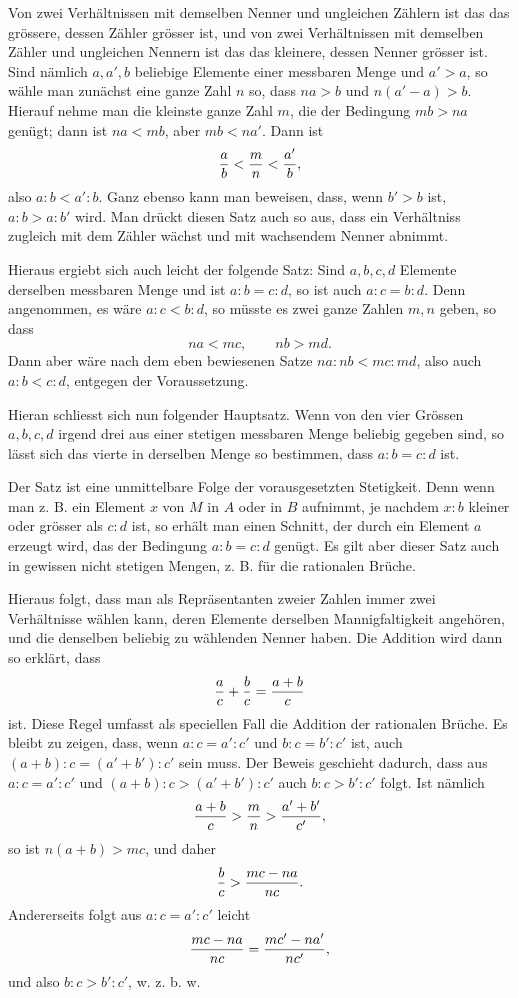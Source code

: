 \documentclass[11pt]{article}
\begin{document}
Von zwei Verhältnissen mit demselben Nenner und ungleichen Zählern ist das das grössere, dessen Zähler grösser ist, und von zwei Verhältnissen mit demselben Zähler und ungleichen Nennern ist das das kleinere, dessen Nenner grösser ist. Sind nämlich $a,a',b$ beliebige Elemente einer messbaren Menge und $a'>a$, so wähle man zunächst eine ganze Zahl $n$ so, dass $na>b$ und $n(a'-a)>b$. Hierauf nehme man die kleinste ganze Zahl $m$, die der Bedingung $mb>na$ genügt; dann ist $na<mb$, aber $mb<na'$. Dann ist
\[
 {a\over b}<{m\over n}<{a'
\over b},
\]
also $a:b<a':b$. Ganz ebenso kann man beweisen, dass, wenn $b'>b$ ist, $a:b>a:b'$ wird. Man drückt diesen Satz auch so aus, dass ein Verhältniss zugleich mit dem Zähler wächst und mit wachsendem Nenner abnimmt.

Hieraus ergiebt sich auch leicht der folgende Satz: Sind $a,b,c,d$ Elemente derselben messbaren Menge und ist $a:b=c:d$, so ist auch $a:c=b:d$. Denn angenommen, es wäre $a:c<b:d$, so müsste es zwei ganze Zahlen $m,n$ geben, so dass
\[
 na<mc,
 \qquad nb>md.
\]
Dann aber wäre nach dem eben bewiesenen Satze $na:nb<mc:md$, also auch $a:b<c:d$, entgegen der Voraussetzung.

Hieran schliesst sich nun folgender Hauptsatz. Wenn von den vier Grössen $a,b,c,d$ irgend drei aus einer stetigen messbaren Menge beliebig gegeben sind, so lässt sich das vierte in derselben Menge so bestimmen, dass $a:b=c:d$ ist.

Der Satz ist eine unmittelbare Folge der vorausgesetzten Stetigkeit. Denn wenn man z. B. ein Element $x$ von $M$ in $A$ oder in $B$ aufnimmt, je nachdem $x:b$ kleiner oder grösser als $c:d$ ist, so erhält man einen Schnitt, der durch ein Element $a$ erzeugt wird, das der Bedingung $a:b=c:d$ genügt. Es gilt aber dieser Satz auch in gewissen nicht stetigen Mengen, z. B. für die rationalen Brüche.

Hieraus folgt, dass man als Repräsentanten zweier Zahlen immer zwei Verhältnisse wählen kann, deren Elemente derselben Mannigfaltigkeit angehören, und die denselben beliebig zu wählenden Nenner haben. Die Addition wird dann so erklärt, dass
\[
 {a\over c}+{b\over c}={a+b\over c}
\]
ist. Diese Regel umfasst als speciellen Fall die Addition der rationalen Brüche. Es bleibt zu zeigen, dass, wenn $a:c=a':c'$ und $b:c=b':c'$ ist, auch $(a+b):c=(a'+b'):c'$ sein muss. Der Beweis geschieht dadurch, dass aus $a:c=a':c'$ und $(a+b):c>(a'+b'):c'$ auch $b:c>b':c'$ folgt. Ist nämlich
\[
 {a+b\over c}>{m\over n}>{a'+b'
\over c'},
\]
so ist $n(a+b)>mc$, und daher
\[
 {b\over c}>{mc-na\over nc}.
\]
Andererseits folgt aus $a:c=a':c'$ leicht
\[
 {mc-na\over nc}={mc'-na'\over nc'},
\]
und also $b:c>b':c'$, w. z. b. w.
\end{document}
